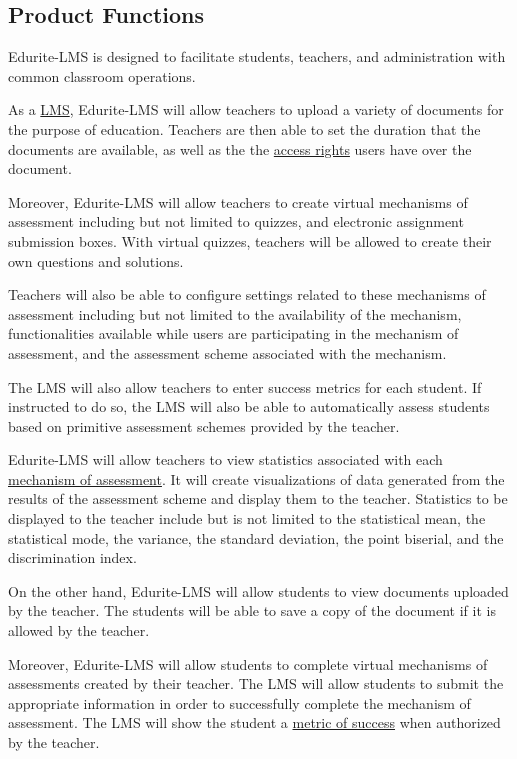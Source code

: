 \documentclass[]{article}
\begin{document}

\subsection{Product Functions}
\label{sub:product_functions}
Edurite-LMS is designed to facilitate students, teachers, and administration 
with common classroom operations. 

As a \underline{LMS}, Edurite-LMS will allow teachers to upload a variety of documents for 
the purpose of education. Teachers are then able to set the duration that the 
documents are available, as well as the the \underline{access rights} users
have over the document.

Moreover, Edurite-LMS will allow teachers to create virtual mechanisms of 
assessment including but not limited to quizzes, and electronic assignment 
submission boxes. With virtual quizzes, teachers will be allowed to create their 
own questions and solutions.

Teachers will also be able to configure settings related to these mechanisms of 
assessment including but not limited to the availability of the mechanism, 
functionalities available while users are participating in the mechanism of 
assessment, and the assessment scheme associated with the mechanism. 

The LMS will also allow teachers to enter success metrics for each student. If 
instructed to do so, the LMS will also be able to automatically assess students 
based on primitive assessment schemes provided by the teacher.

Edurite-LMS will allow teachers to view statistics associated with each 
\underline{mechanism of assessment}. It will create visualizations of data generated from 
the results of the assessment scheme and display them to the teacher. Statistics 
to be displayed to the teacher include but is not limited to the statistical 
mean, the statistical mode, the variance, the standard deviation, the point 
biserial, and the discrimination index.

On the other hand, Edurite-LMS will allow students to view documents uploaded by 
the teacher. The students will be able to save a copy of the document if it is 
allowed by the teacher. 

Moreover, Edurite-LMS will allow students to complete virtual mechanisms of 
assessments created by their teacher. The LMS will allow students to submit the 
appropriate information in order to successfully complete the mechanism of 
assessment. The LMS will show the student a \underline{metric of success} when authorized by 
the teacher.
\end{document}
